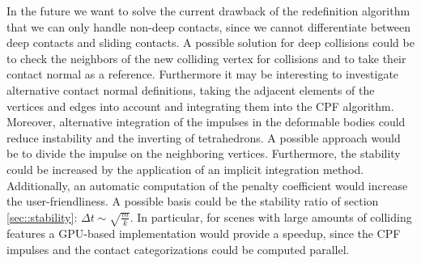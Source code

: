 In the future we want to solve the current drawback of the redefinition algorithm that we can only handle non-deep contacts, since we cannot differentiate between deep contacts and sliding contacts. A possible solution for deep collisions could be to check the neighbors of the new colliding vertex for collisions and to take their contact normal as a reference.  Furthermore it may be interesting to investigate alternative contact normal definitions, taking the adjacent elements of the vertices and edges into account and integrating them into the CPF algorithm.
Moreover, alternative integration of the impulses in the deformable bodies could reduce instability and the inverting of tetrahedrons. A possible approach would be to divide the impulse on the neighboring vertices. Furthermore, the stability could be increased by the application of an implicit integration method. Additionally, an automatic computation of the penalty coefficient would increase the user-friendliness. A possible basis could be the stability ratio of section \ref{sec::stability}: $\Delta t \sim \sqrt{\frac{m}{k}}$. In particular, for scenes with large amounts of colliding features a GPU-based implementation would provide a speedup, since the CPF impulses and the contact categorizations could be computed parallel.